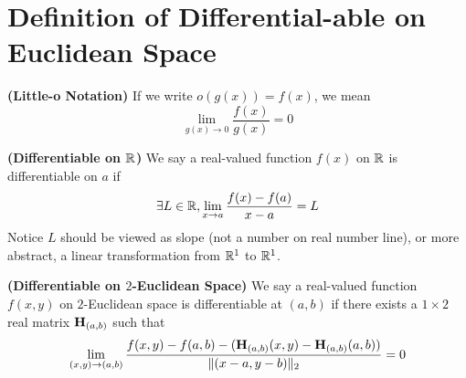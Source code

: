 \documentclass{report}
\begin{document}
\section{Definition of Differential-able on Euclidean Space} 
\begin{definition}
\label{4.2.1}
\textbf{(Little-o Notation)} If we write $o(g(x))=f(x)$, we mean
\begin{equation}
\lim_{g(x)\to 0}\frac{f(x)}{g(x)}=0
\end{equation}
\end{definition}
\begin{definition}
\label{4.2.2}
\textbf{(Differentiable on $\mathbb{R}$)} We say a real-valued function $f(x)$ on $\mathbb{R}$ is differentiable on $a$ if 
\begin{equation}
\exists L\in \mathbb{R}, \lim_{x \to a}\frac{f(x)-f(a)}{x-a}=L
\end{equation}
Notice $L$ should be viewed as slope (not a number on real number line), or more abstract, a linear transformation from $\mathbb{R}^1$ to  $\mathbb{R}^1$. 
\end{definition}
\begin{definition}
\label{4.2.3}
\textbf{(Differentiable on $2$-Euclidean Space)} We say a real-valued function $f(x,y)$ on $2$-Euclidean space is differentiable at $(a,b)$ if there exists a $1\times 2$ real matrix $\textbf{H}_{(a,b)}$ such that 
\begin{equation}
 \lim_{(x,y)\to (a,b)}\frac{f(x,y)-f(a,b)-(\textbf{H}_{(a,b)}(x,y)-\textbf{H}_{(a,b)}(a,b))}{\| (x-a,y-b) \|_2}=0
\end{equation}
\end{definition}
\end{document}

